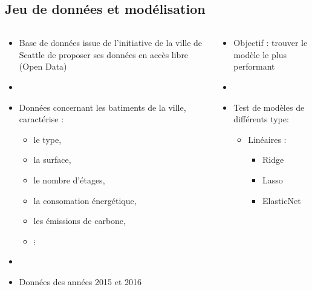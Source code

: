 \documentclass[8pt,aspectratio=169,hyperref={unicode=true}]{beamer}
\begin{document}
\subsection{Jeu de données et modélisation}
\begin{frame}{\insertsubsection}
  \begin{columns}[t]
    \begin{column}{.5\textwidth}
      \begin{itemize}
        \item Base de données issue de l'initiative de la ville de Seattle de proposer ses
              données en accès libre (Open Data)
        \item[]
        \item Données concernant les batiments de la ville, caractérise :
              \begin{itemize}
                \item le type,
                \item la surface,
                \item le nombre d'étages,
                \item la consomation énergétique,
                \item les émissions de carbone,
                \item $\vdots$
              \end{itemize}
        \item[]
        \item Données des années 2015 et 2016
      \end{itemize}
    \end{column}
    \begin{column}{.5\textwidth}
      \begin{itemize}
        \item Objectif : trouver le modèle le plus performant
        \item[]
        \item Test de modèles de différents type:
              \begin{itemize}
                \item Linéaires :
                      \begin{itemize}
                        \item Ridge
                        \item Lasso
                        \item ElasticNet
                      \end{itemize}

\end{itemize}
\end{itemize}
\end{column}
\end{columns}
\end{frame}
\end{document}
